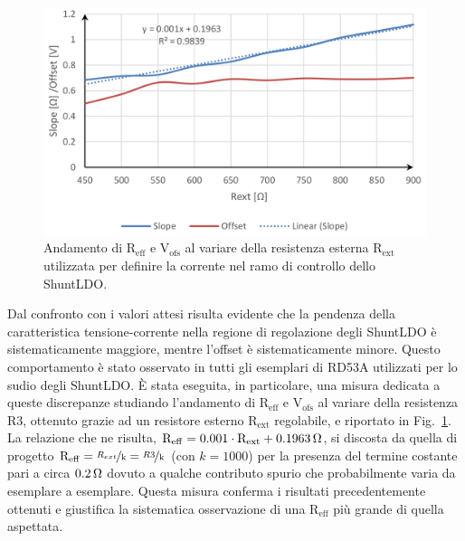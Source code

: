 \begin{figure}
\centering
\includegraphics[width=\textwidth]{Immagini/R3Karagounis}
\caption{Andamento di $\mathrm{R_{eff}}$ e $\mathrm{V_{ofs}}$ al variare della resistenza esterna $\mathrm{R_{ext}}$ utilizzata per definire la corrente nel ramo di controllo dello ShuntLDO.}%
\label{R3Karagounis}
\end{figure}
Dal confronto con i valori attesi risulta evidente che la pendenza della caratteristica tensione-corrente nella regione di regolazione degli ShuntLDO è sistematicamente maggiore, mentre l'offset è sistematicamente minore. 
Questo comportamento è stato osservato in tutti gli esemplari di RD53A utilizzati per lo sudio degli ShuntLDO. \`E stata eseguita, in particolare, una misura dedicata a queste discrepanze studiando l'andamento di $\mathrm{R_{eff}}$ e $\mathrm{V_{ofs}}$ al variare della resistenza $\mathrm{R3}$, ottenuto grazie ad un resistore esterno $\mathrm{R_{ext}}$ regolabile, e riportato in Fig.~\ref{R3Karagounis}. 
La relazione che ne risulta, $\mathrm{R_{eff}} = 0.001\cdot \mathrm{R_{ext}} + 0.1963{\rm \, \Omega}$, si discosta da quella di progetto $\mathrm{R_{eff} = \nicefrac{R_{ext}}{k} = \nicefrac{R3}{k}}$ (con $k=1000$) per la presenza del termine costante pari a circa $0.2{\rm \, \Omega}$ dovuto a qualche contributo spurio che probabilmente varia da esemplare a esemplare. Questa misura conferma i risultati precedentemente ottenuti e giustifica la sistematica osservazione di una $\mathrm{R_{eff}}$ pi\`u grande di quella aspettata. 

